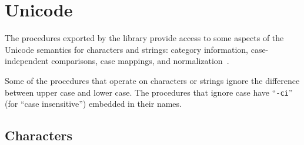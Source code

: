 \chapter{Unicode}
\label{unicodechapter}

The procedures exported by the 
library provide access to some aspects
of the Unicode semantics for characters and strings:
category information, case-independent comparisons,
case mappings, and normalization~\cite{Unicode}.

Some of the procedures that operate on characters or strings ignore the
difference between upper case and lower case.  The procedures that
ignore case have \hbox{``{\tt -ci}''} (for ``case
insensitive'') embedded in their names.

\section{Characters}

